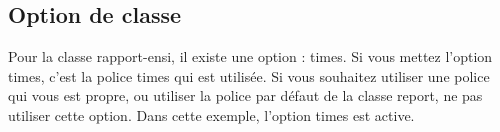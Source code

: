 \documentclass[times]{rapport-ensi}
\begin{document}
\subsection{Option de classe}
Pour la classe rapport-ensi, il existe une option : times. 
Si vous mettez l'option times, c'est la police times qui est utilisée. 
Si vous souhaitez utiliser une police qui vous est propre, 
ou utiliser la police par défaut de la classe report, ne pas utiliser cette option. Dans cette exemple, l'option times est active.
\end{document}
